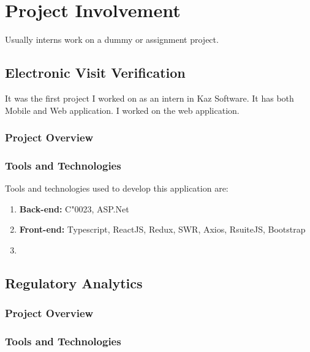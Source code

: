 \chapter{Project Involvement}

Usually interns work on a dummy or assignment project.

\section{Electronic Visit Verification}

It was the first project I worked on as an intern in Kaz Software. It has both Mobile and Web application. I worked on the web application.

\subsection{Project Overview}

\subsection{Tools and Technologies}

Tools and technologies used to develop this application are:

\begin{enumerate}
    \item \textbf{Back-end:} C\char"0023, ASP.Net
    \item \textbf{Front-end:} Typescript, ReactJS, Redux, SWR, Axios, RsuiteJS, Bootstrap
    \item 
\end{enumerate}


\section{Regulatory Analytics}

\subsection{Project Overview}

\subsection{Tools and Technologies}